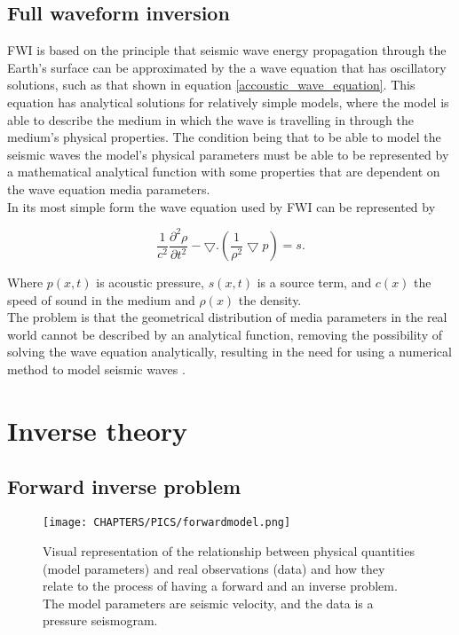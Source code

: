 \subsection{Full waveform inversion} 
FWI is based on the principle that seismic wave energy propagation through the Earth’s surface can be approximated by the a wave equation that has oscillatory solutions, such as that shown in equation \ref{accoustic_wave_equation}. This equation has analytical solutions for relatively simple models, where the model is able to describe the medium in which the wave is travelling in through the medium's physical properties. The condition being that to be able to model the seismic waves the model's physical parameters must be able to be represented by a mathematical analytical function with some properties that are dependent on the wave equation media parameters. \\
In its most simple form the wave equation used by FWI can be represented by 

\begin{equation}
\frac{1}{c^{2}}\frac{\partial ^{2}\rho }{\partial t^{2}} -\bigtriangledown.\left ( \frac{1}{\rho^{2}} \bigtriangledown p\right ) = s. 
\label{accoustic_wave_equation}
\end{equation}

Where $p(x,t)$ is acoustic pressure, $s(x,t)$ is a source term, and $c(x)$ the speed of sound in the medium and $\rho(x)$ the density. \\

The problem is that the geometrical distribution of media parameters in the real world cannot be described by an analytical function, removing the possibility of solving the wave equation analytically, resulting in the need for using a numerical method to model seismic waves \citep{guasch20123d}. 

\section{Inverse theory} 

\subsection{Forward inverse problem}

\begin{figure}[!ht]
\begin{center}
\texttt{[image: CHAPTERS/PICS/forwardmodel.png]}
\caption[Visual representation of the difference between a forward and inverse problem]{Visual representation of the relationship between physical quantities (model parameters) and real observations (data) and how they relate to the process of having a forward and an inverse problem. The model parameters are seismic velocity, and the data is a pressure seismogram.}
\label{forward_problem}
\end{center}
\end{figure}

